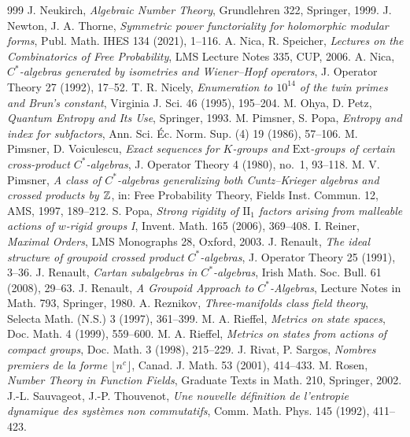 \begin{thebibliography}{999}
 J. Neukirch, \emph{Algebraic Number Theory}, Grundlehren 322, Springer, 1999.
 J. Newton, J. A. Thorne, \emph{Symmetric power functoriality for holomorphic modular forms}, Publ. Math. IHES 134 (2021), 1--116.
 A. Nica, R. Speicher, \emph{Lectures on the Combinatorics of Free Probability}, LMS Lecture Notes 335, CUP, 2006.
 A. Nica, \emph{$C^*$-algebras generated by isometries and Wiener--Hopf operators}, J. Operator Theory 27 (1992), 17--52.
 T. R. Nicely, \emph{Enumeration to $10^{14}$ of the twin primes and Brun's constant}, Virginia J. Sci. 46 (1995), 195--204.
 M. Ohya, D. Petz, \emph{Quantum Entropy and Its Use}, Springer, 1993.
 M. Pimsner, S. Popa, \emph{Entropy and index for subfactors}, Ann. Sci. \'Ec. Norm. Sup. (4) 19 (1986), 57--106.
 M. Pimsner, D. Voiculescu, \emph{Exact sequences for $K$-groups and $\mathrm{Ext}$-groups of certain cross-product $C^*$-algebras}, J. Operator Theory 4 (1980), no.~1, 93--118.
 M. V. Pimsner, \emph{A class of $C^*$-algebras generalizing both Cuntz--Krieger algebras and crossed products by $\mathbb{Z}$}, in: Free Probability Theory, Fields Inst. Commun. 12, AMS, 1997, 189--212.
 S. Popa, \emph{Strong rigidity of $\mathrm{II}_1$ factors arising from malleable actions of $w$-rigid groups I}, Invent. Math. 165 (2006), 369--408.
 I. Reiner, \emph{Maximal Orders}, LMS Monographs 28, Oxford, 2003.
 J. Renault, \emph{The ideal structure of groupoid crossed product $C^*$-algebras}, J. Operator Theory 25 (1991), 3--36.
 J. Renault, \emph{Cartan subalgebras in $C^*$-algebras}, Irish Math. Soc. Bull. 61 (2008), 29--63.
 J. Renault, \emph{A Groupoid Approach to $C^*$-Algebras}, Lecture Notes in Math. 793, Springer, 1980.
 A. Reznikov, \emph{Three-manifolds class field theory}, Selecta Math. (N.S.) 3 (1997), 361--399.
 M. A. Rieffel, \emph{Metrics on state spaces}, Doc. Math. 4 (1999), 559--600.
 M. A. Rieffel, \emph{Metrics on states from actions of compact groups}, Doc. Math. 3 (1998), 215--229.
 J. Rivat, P. Sargos, \emph{Nombres premiers de la forme $\lfloor n^c\rfloor$}, Canad. J. Math. 53 (2001), 414--433.
 M. Rosen, \emph{Number Theory in Function Fields}, Graduate Texts in Math. 210, Springer, 2002.
 J.-L. Sauvageot, J.-P. Thouvenot, \emph{Une nouvelle d\'efinition de l'entropie dynamique des syst\`emes non commutatifs}, Comm. Math. Phys. 145 (1992), 411--423.

\end{thebibliography}
